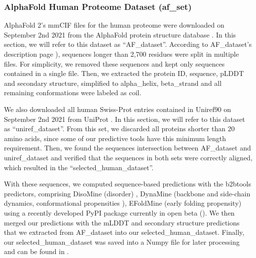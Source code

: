 \subsubsection[AlphaFold Human Proteome Dataset]{AlphaFold Human Proteome Dataset (af_set)}
AlphaFold 2’s mmCIF files for the human proteome were downloaded on September 2nd 2021 from the AlphaFold protein structure database \cite{tunyasuvunakool_highly_2021}. In this section, we will refer to this dataset as ``AF_dataset''. According to AF_dataset’s description page ), sequences longer than 2,700 residues were split in multiple files. For simplicity, we removed these sequences and kept only sequences contained in a single file. Then, we extracted the protein ID, sequence, pLDDT and secondary structure, simplified to alpha_helix, beta_strand and all remaining conformations were labeled as coil. 

We also downloaded all human Swiss-Prot entries contained in Uniref90 \cite{suzek_uniref_2007} on September 2nd 2021 from UniProt \cite{the_uniprot_consortium_uniprot_2021}. In this section, we will refer to this dataset as ``uniref_dataset''.  From this set, we discarded all proteins shorter than 20 amino acids, since some of our predictive tools have this minimum length requirement. Then, we found the sequences intersection between AF_dataset and uniref_dataset and verified that the sequences in both sets were correctly aligned, which resulted in the ``selected_human_dataset''. 

With these sequences, we computed sequence-based predictions with the b2btools predictors, comprising DisoMine (disorder) \cite{orlando_prediction_2022}, DynaMine (backbone \cite{cilia_protein_2013} and side-chain dynamics, conformational propensities \cite{raimondi_exploring_2017}), EFoldMine (early folding propensity) \cite{raimondi_exploring_2017} using a recently developed PyPI package currently in open beta (). We then merged our predictions with the mLDDT and secondary structure predictions that we extracted from AF_dataset into our selected_human_dataset. Finally, our selected_human_dataset was saved into a Numpy file for later processing and can be found in .


